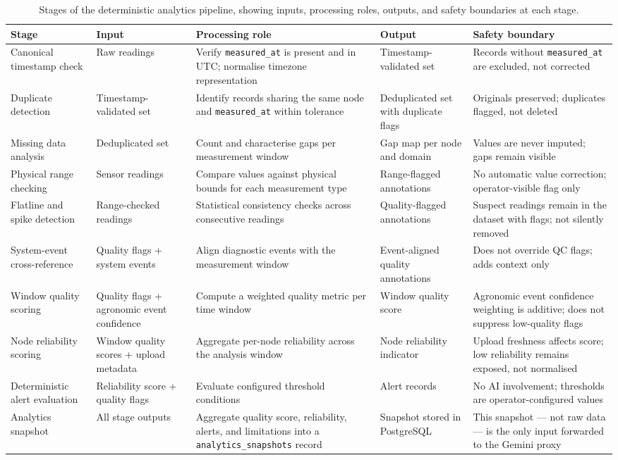 \begin{table}[H]
\centering
\caption{Stages of the deterministic analytics pipeline, showing inputs, processing roles, outputs, and safety boundaries at each stage.}
\label{tab:analytics-pipeline}
\small
\begin{tabular}{p{2.8cm} p{2.5cm} p{3.0cm} p{2.8cm} p{2.5cm}}
\hline
\textbf{Stage} & \textbf{Input} & \textbf{Processing role} & \textbf{Output} & \textbf{Safety boundary} \\
\hline
Canonical timestamp check & Raw readings & Verify \texttt{measured\_at} is present and in UTC; normalise timezone representation & Timestamp-validated set & Records without \texttt{measured\_at} are excluded, not corrected \\
\hline
Duplicate detection & Timestamp-validated set & Identify records sharing the same node and \texttt{measured\_at} within tolerance & Deduplicated set with duplicate flags & Originals preserved; duplicates flagged, not deleted \\
\hline
Missing data analysis & Deduplicated set & Count and characterise gaps per measurement window & Gap map per node and domain & Values are never imputed; gaps remain visible \\
\hline
Physical range checking & Sensor readings & Compare values against physical bounds for each measurement type & Range-flagged annotations & No automatic value correction; operator-visible flag only \\
\hline
Flatline and spike detection & Range-checked readings & Statistical consistency checks across consecutive readings & Quality-flagged annotations & Suspect readings remain in the dataset with flags; not silently removed \\
\hline
System-event cross-reference & Quality flags + system events & Align diagnostic events with the measurement window & Event-aligned quality annotations & Does not override QC flags; adds context only \\
\hline
Window quality scoring & Quality flags + agronomic event confidence & Compute a weighted quality metric per time window & Window quality score & Agronomic event confidence weighting is additive; does not suppress low-quality flags \\
\hline
Node reliability scoring & Window quality scores + upload metadata & Aggregate per-node reliability across the analysis window & Node reliability indicator & Upload freshness affects score; low reliability remains exposed, not normalised \\
\hline
Deterministic alert evaluation & Reliability score + quality flags & Evaluate configured threshold conditions & Alert records & No AI involvement; thresholds are operator-configured values \\
\hline
Analytics snapshot & All stage outputs & Aggregate quality score, reliability, alerts, and limitations into a \texttt{analytics\_snapshots} record & Snapshot stored in PostgreSQL & This snapshot — not raw data — is the only input forwarded to the Gemini proxy \\
\hline
\end{tabular}
\end{table}

